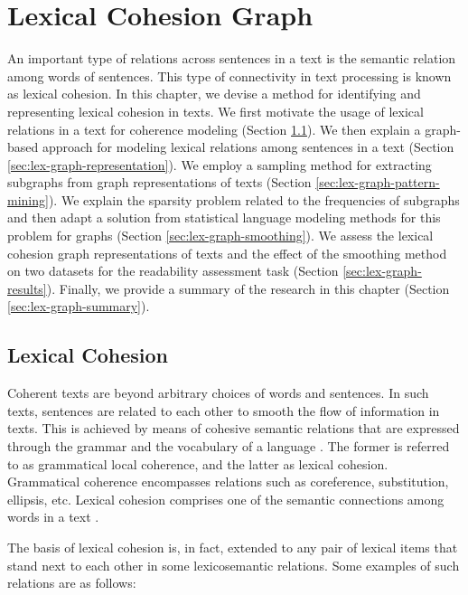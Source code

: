 
\chapter{Lexical Cohesion Graph}
\label{ch:lex-graph}

An important type of relations across sentences in a text is the semantic relation among words of sentences. 
This type of connectivity in text processing is known as lexical cohesion. 
In this chapter, we devise a method for identifying and representing lexical cohesion in texts. 
We first motivate the usage of lexical relations in a text for coherence modeling (Section \ref{sec:lex-graph-motivation}). 
We then explain a graph-based approach for modeling lexical relations among sentences in a text (Section \ref{sec:lex-graph-representation}). 
We employ a sampling method for extracting subgraphs from graph representations of texts (Section \ref{sec:lex-graph-pattern-mining}). 
We explain the sparsity problem related to the frequencies of subgraphs and then adapt a solution from statistical language modeling methods for this problem for graphs (Section \ref{sec:lex-graph-smoothing}). 
We assess the lexical cohesion graph representations of texts  and the effect of the smoothing method on two datasets for the readability assessment task (Section \ref{sec:lex-graph-results}). 
Finally, we provide a summary of the research in this chapter (Section \ref{sec:lex-graph-summary}).

\section{Lexical Cohesion}
\label{sec:lex-graph-motivation}

Coherent texts are beyond arbitrary choices of words and sentences.  
In such texts, sentences are related to each other to smooth the flow of information in texts. 
This is achieved by means of cohesive semantic relations that are expressed through the grammar and the vocabulary of a language \cite{halliday76}. 
The former is referred to as grammatical local coherence, and the latter as lexical cohesion.  
Grammatical coherence encompasses relations such as coreference, substitution, ellipsis, etc. 
Lexical cohesion comprises one of the semantic connections among words in a text \cite{hoey91}. 

The basis of lexical cohesion is, in fact, extended to any pair of lexical items that stand next to each other in some lexicosemantic relations. 
Some examples of such relations are as follows: 

